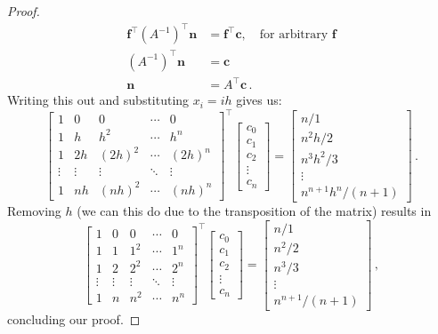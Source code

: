 \begin{proof}
\begin{align}
    \mathbf f^\top (A^{-1})^\top \mathbf n  &= \mathbf f^\top \mathbf c, \quad \textrm{for arbitrary $\mathbf f$} \nonumber \\
    (A^{-1})^\top \mathbf n  &= \mathbf c \nonumber \\
    \mathbf n  &= A^\top \mathbf c \,. \nonumber
\end{align}
Writing this out and substituting $x_i = ih$ gives us:
\begin{equation}
    \begin{bmatrix}
        1&0&0&\cdots&0 \\
        1&h&h^2&\cdots&h^n \\
        1&2h&(2h)^2&\cdots&(2h)^n \\
        \vdots&\vdots & \vdots & \ddots & \vdots\\
        1&nh&(nh)^2&\cdots&(nh)^n
    \end{bmatrix}^\top
    \begin{bmatrix}
        c_0 \\
        c_1 \\
        c_2 \\
        \vdots \\
        c_n
    \end{bmatrix}
    =
    \begin{bmatrix}
        n/1\\
        n^2h/2\\
        n^3h^2/3\\
        \vdots \\
        n^{n+1}h^n/(n+1)
    \end{bmatrix} \,. \nonumber
\end{equation}
Removing $h$ (we can this do due to the transposition of the matrix) results in
\begin{equation}
    \begin{bmatrix}
        1&0&0&\cdots&0 \\
        1&1&1^2&\cdots&1^n \\
        1&2&2^2&\cdots&2^n \\
        \vdots&\vdots & \vdots & \ddots & \vdots\\
        1&n&n^2&\cdots&n^n
    \end{bmatrix}^\top
    \begin{bmatrix}
        c_0 \\
        c_1 \\
        c_2 \\
        \vdots \\
        c_n
    \end{bmatrix}
    =
    \begin{bmatrix}
        n/1\\
        n^2/2\\
        n^3/3\\
        \vdots \\
        n^{n+1}/(n+1)
    \end{bmatrix} \,, \nonumber
\end{equation}
concluding our proof.
\end{proof}

